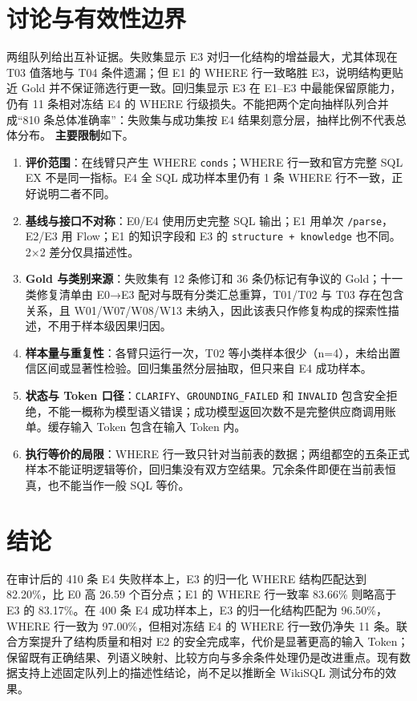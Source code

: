 \documentclass[conference]{IEEEtran}
\begin{document}
\section{讨论与有效性边界}
两组队列给出互补证据。失败集显示 E3 对归一化结构的增益最大，尤其体现在 T03 值落地与 T04 条件遗漏；但 E1 的 WHERE 行一致略胜 E3，说明结构更贴近 Gold 并不保证筛选行更一致。回归集显示 E3 在 E1–E3 中最能保留原能力，仍有 11 条相对冻结 E4 的 WHERE 行级损失。不能把两个定向抽样队列合并成“810 条总体准确率”：失败集与成功集按 E4 结果刻意分层，抽样比例不代表总体分布。
\textbf{主要限制}如下。
\begin{enumerate}
\item \raggedright \textbf{评价范围}：在线臂只产生 WHERE \texttt{conds}；WHERE 行一致和官方完整 SQL EX 不是同一指标。E4 全 SQL 成功样本里仍有 1 条 WHERE 行不一致，正好说明二者不同。
\item \raggedright \textbf{基线与接口不对称}：E0/E4 使用历史完整 SQL 输出；E1 用单次 \texttt{/\allowbreak{}parse}，E2/E3 用 Flow；E1 的知识字段和 E3 的 \texttt{structure + knowledge} 也不同。2×2 差分仅具描述性。
\item \raggedright \textbf{Gold 与类别来源}：失败集有 12 条修订和 36 条仍标记有争议的 Gold；十一类修复清单由 E0→E3 配对与既有分类汇总重算，T01/T02 与 T03 存在包含关系，且 W01/W07/W08/W13 未纳入，因此该表只作修复构成的探索性描述，不用于样本级因果归因。
\item \raggedright \textbf{样本量与重复性}：各臂只运行一次，T02 等小类样本很少（n=4），未给出置信区间或显著性检验。回归集虽然分层抽取，但只来自 E4 成功样本。
\item \raggedright \textbf{状态与 Token 口径}：\texttt{CLARIFY}、\texttt{GROUNDING\_FAILED} 和 \texttt{INVALID} 包含安全拒绝，不能一概称为模型语义错误；成功模型返回次数不是完整供应商调用账单。缓存输入 Token 包含在输入 Token 内。
\item \raggedright \textbf{执行等价的局限}：WHERE 行一致只针对当前表的数据；两组都空的五条正式样本不能证明逻辑等价，回归集没有双方空结果。冗余条件即便在当前表恒真，也不能当作一般 SQL 等价。
\end{enumerate}
\section{结论}
在审计后的 410 条 E4 失败样本上，E3 的归一化 WHERE 结构匹配达到 82.20\%，比 E0 高 26.59 个百分点；E1 的 WHERE 行一致率 83.66\% 则略高于 E3 的 83.17\%。在 400 条 E4 成功样本上，E3 的归一化结构匹配为 96.50\%，WHERE 行一致为 97.00\%，但相对冻结 E4 的 WHERE 行一致仍净失 11 条。联合方案提升了结构质量和相对 E2 的安全完成率，代价是显著更高的输入 Token；保留既有正确结果、列语义映射、比较方向与多余条件处理仍是改进重点。现有数据支持上述固定队列上的描述性结论，尚不足以推断全 WikiSQL 测试分布的效果。
\needspace{4cm}
\end{document}
